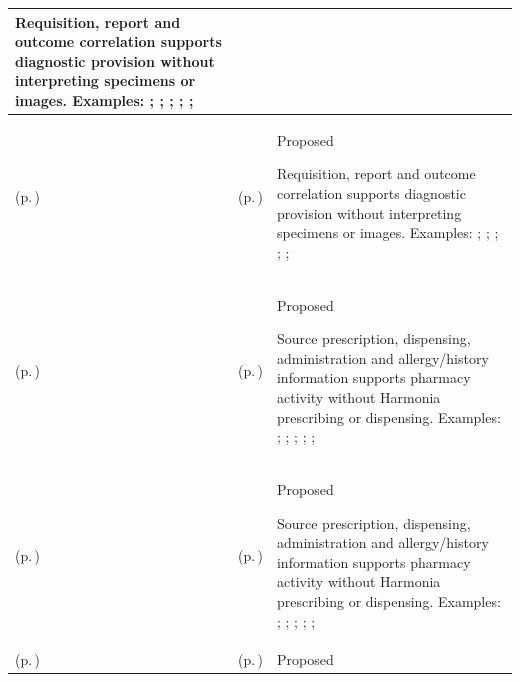 \begin{longtable}{|>{\raggedright\arraybackslash}p{0.27\TableWidth}|>{\raggedright\arraybackslash}p{0.27\TableWidth}|>{\raggedright\arraybackslash}p{0.46\TableWidth}|}
Requisition, report and outcome correlation supports diagnostic provision without interpreting specimens or images. Examples: \nameref{feature:feat-sd-09}; \nameref{feature:feat-sd-10}; \nameref{function:receive-diagnostic-requisition-feed}; \nameref{service:modality-worklist-distribution}; \nameref{function:publish-governed-diagnostic-report}; \nameref{service:diagnostic-publication-service}\\\hline
\nameref{cap:bc-diagnostic-support-provision} (p.\,\pageref{cap:bc-diagnostic-support-provision}) & \nameref{cap:bec-order-administration} (p.\,\pageref{cap:bec-order-administration}) & Proposed

Requisition, report and outcome correlation supports diagnostic provision without interpreting specimens or images. Examples: \nameref{feature:feat-sa-11}; \nameref{feature:feat-sa-12}; \nameref{feature:feat-sa-13}; \nameref{feature:feat-sa-14}; \nameref{function:receive-order-request}; \nameref{service:order-requisition-ingress}\\\hline
\nameref{cap:bc-medication-pharmacy-services} (p.\,\pageref{cap:bc-medication-pharmacy-services}) & \nameref{cap:bec-medication-administration} (p.\,\pageref{cap:bec-medication-administration}) & Proposed

Source prescription, dispensing, administration and allergy/history information supports pharmacy activity without Harmonia prescribing or dispensing. Examples: \nameref{feature:feat-sa-18}; \nameref{feature:feat-sa-19}; \nameref{feature:feat-sa-20}; \nameref{function:receive-medication-order}; \nameref{service:medication-order-ingress}; \nameref{function:track-dispense-event}\\\hline
\nameref{cap:bc-medication-pharmacy-services} (p.\,\pageref{cap:bc-medication-pharmacy-services}) & \nameref{cap:bec-medication-therapy} (p.\,\pageref{cap:bec-medication-therapy}) & Proposed

Source prescription, dispensing, administration and allergy/history information supports pharmacy activity without Harmonia prescribing or dispensing. Examples: \nameref{feature:feat-sd-11}; \nameref{feature:feat-sd-12}; \nameref{function:project-longitudinal-medication-history}; \nameref{service:longitudinal-medication-history-query}; \nameref{function:correlate-adverse-reaction-allergy-profile}; \nameref{service:allergy-adverse-reaction-query}\\\hline
\nameref{cap:bc-clinical-technology-management} (p.\,\pageref{cap:bc-clinical-technology-management}) & \nameref{cap:bec-clinical-device-administration} (p.\,\pageref{cap:bec-clinical-device-administration}) & Proposed


\end{longtable}
